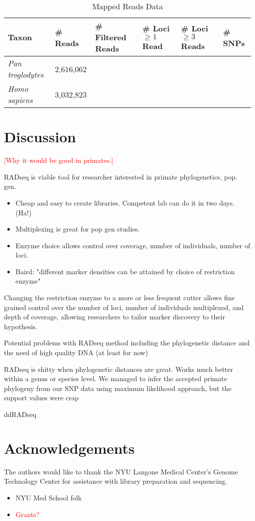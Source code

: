 \documentclass[12pt]{article}
\begin{document}
\begin{table}[h]
\caption{Mapped Reads Data}
\begin{center}
	\small
	\begin{tabular}{ p{3cm} || p{1.75cm} | p{1.75cm} || p{1.75cm} | p{1.75cm} | l }
		\hline
		Taxon & \# Reads & \# Filtered Reads & \# Loci $\ge 1$ Read & \# Loci $\ge 3$ Reads & \# SNPs \\ \hline\hline
		\emph{Pan troglodytes} & 2,616,062 &  &  &  &  \\ \hline
		\emph{Homo sapiens}    & 3,032,823 &  &  &  &  \\ \hline
	\end{tabular}
\end{center}
\end{table}


\section{Discussion}

\textcolor{red}{[Why it would be good in primates.]}

RADseq is viable tool for researcher interested in primate phylogenetics, pop. gen.

\begin{itemize}
	\item Cheap and easy to create libraries. Competent lab can do it in two days. (Ha!)
	\item Multiplexing is great for pop gen studies.
	\item Enzyme choice allows control over coverage, number of individuals, number of loci.
	\item Baird: "different marker densities can be attained by choice of restriction enzyme"
\end{itemize}
	
Changing the restriction enzyme to a more or less frequent cutter allows fine grained control over the number of loci, number of individuals multiplexed, and depth of coverage, allowing researchers to tailor marker discovery to their hypothesis. 

Potential problems with RADseq method including the phylogenetic distance and the need of high quality DNA (at least for now)

RADseq is shitty when phylogenetic distances are great. Works much better within a genus or species level. We managed to infer the accepted primate phylogeny from our SNP data using maximum likelihood approach, but the support values were crap

ddRADseq

\section{Acknowledgements}

The authors would like to thank the NYU Langone Medical Center's Genome Technology Center for assistance with library preparation and sequencing.

\begin{itemize}
	\item NYU Med School folk
	\item \textcolor{red}{Grants?}
\end{itemize}
\end{document}
